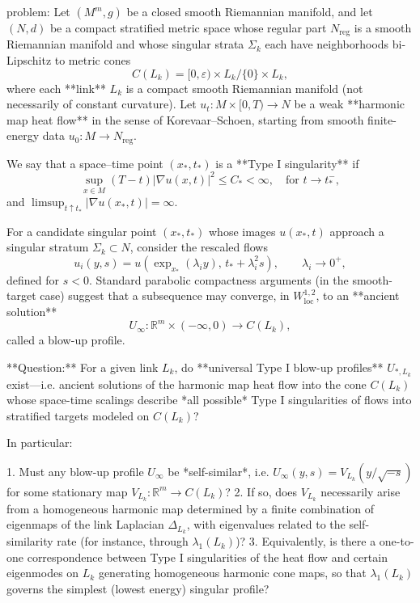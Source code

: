 problem:  
Let \( (M^m,g) \) be a closed smooth Riemannian manifold, and let \( (N,d) \) be a compact stratified metric space whose regular part \(N_{\mathrm{reg}}\) is a smooth Riemannian manifold and whose singular strata \(\Sigma_k\) each have neighborhoods bi-Lipschitz to metric cones  
\[
C(L_k) = [0,\varepsilon)\times L_k / \{0\}\times L_k,
\]
where each **link** \(L_k\) is a compact smooth Riemannian manifold (not necessarily of constant curvature).  
Let \(u_t : M\times[0,T) \to N\) be a weak **harmonic map heat flow** in the sense of Korevaar–Schoen, starting from smooth finite-energy data \(u_0:M\to N_{\mathrm{reg}}\).  

We say that a space–time point \((x_*,t_*)\) is a **Type I singularity** if  
\[
\sup_{x\in M} (T-t) |\nabla u(x,t)|^2 \le C_*<\infty,\quad \text{for } t \to t_*^{-},
\]
and \( \limsup_{t\uparrow t_*} |\nabla u(x_*,t)| = \infty.\)

For a candidate singular point \((x_*,t_*)\) whose images \(u(x_*,t)\) approach a singular stratum \(\Sigma_k\subset N\), consider the rescaled flows  
\[
u_i(y,s) = u(\exp_{x_*}(\lambda_i y),\, t_* + \lambda_i^2 s), \qquad \lambda_i\to 0^+,
\]
defined for \(s<0\).  Standard parabolic compactness arguments (in the smooth-target case) suggest that a subsequence may converge, in \(W^{1,2}_{\mathrm{loc}}\), to an **ancient solution**
\[
U_\infty : \mathbb{R}^m \times (-\infty,0) \longrightarrow C(L_k),
\]
called a blow-up profile.

**Question:**  
For a given link \(L_k\), do **universal Type I blow-up profiles** \(U_{*,L_k}\) exist—i.e. ancient solutions of the harmonic map heat flow into the cone \(C(L_k)\) whose space-time scalings describe *all possible* Type I singularities of flows into stratified targets modeled on \(C(L_k)\)?  

In particular:  

1. Must any blow-up profile \(U_\infty\) be *self-similar*, i.e. \(U_\infty(y,s) = V_{L_k}(y/\sqrt{-s})\) for some stationary map \(V_{L_k}\colon \mathbb{R}^m \to C(L_k)\)?  
2. If so, does \(V_{L_k}\) necessarily arise from a homogeneous harmonic map determined by a finite combination of eigenmaps of the link Laplacian \(\Delta_{L_k}\), with eigenvalues related to the self-similarity rate (for instance, through \(\lambda_1(L_k)\))?  
3. Equivalently, is there a one-to-one correspondence between Type I singularities of the heat flow and certain eigenmodes on \(L_k\) generating homogeneous harmonic cone maps, so that \(\lambda_1(L_k)\) governs the simplest (lowest energy) singular profile?

